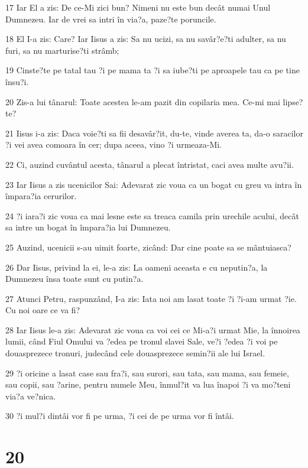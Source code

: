 \par 17 Iar El a zis: De ce-Mi zici bun? Nimeni nu este bun decât numai Unul Dumnezeu. Iar de vrei sa intri în via?a, paze?te poruncile.
\par 18 El I-a zis: Care? Iar Iisus a zis: Sa nu ucizi, sa nu savâr?e?ti adulter, sa nu furi, sa nu marturise?ti strâmb;
\par 19 Cinste?te pe tatal tau ?i pe mama ta ?i sa iube?ti pe aproapele tau ca pe tine însu?i.
\par 20 Zis-a lui tânarul: Toate acestea le-am pazit din copilaria mea. Ce-mi mai lipse?te?
\par 21 Iisus i-a zis: Daca voie?ti sa fii desavâr?it, du-te, vinde averea ta, da-o saracilor ?i vei avea comoara în cer; dupa aceea, vino ?i urmeaza-Mi.
\par 22 Ci, auzind cuvântul acesta, tânarul a plecat întristat, caci avea multe avu?ii.
\par 23 Iar Iisus a zis ucenicilor Sai: Adevarat zic voua ca un bogat cu greu va intra în împara?ia cerurilor.
\par 24 ?i iara?i zic voua ca mai lesne este sa treaca camila prin urechile acului, decât sa intre un bogat în împara?ia lui Dumnezeu.
\par 25 Auzind, ucenicii s-au uimit foarte, zicând: Dar cine poate sa se mântuiasca?
\par 26 Dar Iisus, privind la ei, le-a zis: La oameni aceasta e cu neputin?a, la Dumnezeu însa toate sunt cu putin?a.
\par 27 Atunci Petru, raspunzând, I-a zis: Iata noi am lasat toate ?i ?i-am urmat ?ie. Cu noi oare ce va fi?
\par 28 Iar Iisus le-a zis: Adevarat zic voua ca voi cei ce Mi-a?i urmat Mie, la înnoirea lumii, când Fiul Omului va ?edea pe tronul slavei Sale, ve?i ?edea ?i voi pe douasprezece tronuri, judecând cele douasprezece semin?ii ale lui Israel.
\par 29 ?i oricine a lasat case sau fra?i, sau surori, sau tata, sau mama, sau femeie, sau copii, sau ?arine, pentru numele Meu, înmul?it va lua înapoi ?i va mo?teni via?a ve?nica.
\par 30 ?i mul?i dintâi vor fi pe urma, ?i cei de pe urma vor fi întâi.

\chapter{20}


